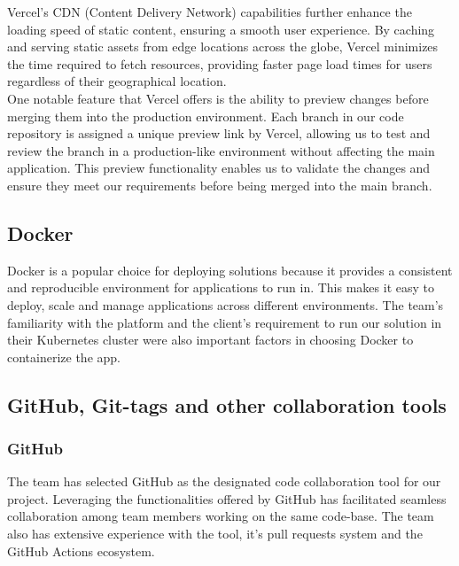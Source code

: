 \noindent
Vercel's CDN (Content Delivery Network) capabilities further enhance the loading speed of static content, ensuring a smooth user experience. By caching and serving static assets from edge locations across the globe, Vercel minimizes the time required to fetch resources, providing faster page load times for users regardless of their geographical location. \\

\noindent
One notable feature that Vercel offers is the ability to preview changes before merging them into the production environment. Each branch in our code repository is assigned a unique preview link by Vercel, allowing us to test and review the branch in a production-like environment without affecting the main application. \cite{vercel_preview_deployments} This preview functionality enables us to validate the changes and ensure they meet our requirements before being merged into the main branch. \\


\subsection{Docker}

Docker is a popular choice for deploying solutions because it provides a consistent and reproducible environment for applications to run in. This makes it easy to deploy, scale and manage applications across different environments. \cite{Docker2022geeksforgeeks} The team’s familiarity with the platform and the client’s requirement to run our solution in their Kubernetes cluster were also important factors in choosing Docker to containerize the app.

\subsection{GitHub, Git-tags and other collaboration tools}

\subsubsection{GitHub}

The team has selected GitHub as the designated code collaboration tool for our project. Leveraging the functionalities offered by GitHub has facilitated seamless collaboration among team members working on the same code-base. The team also has extensive experience with the tool, it's pull requests system and the GitHub Actions ecosystem. 


